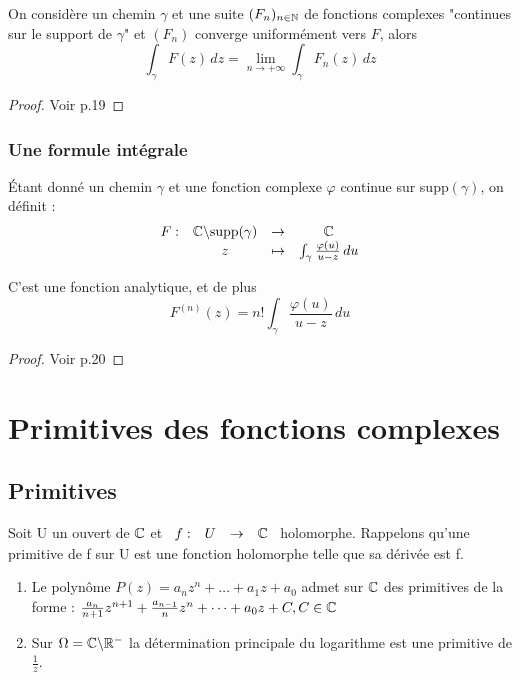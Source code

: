 \documentclass[]{report}
\begin{document}
\begin{lm}{}{}
    On considère un chemin $\gamma$ et une suite $(F_n)_{n\in\mathbb{N}}$ de fonctions complexes "continues sur le support de $\gamma$" et $(F_n)$ converge uniformément vers $F$, alors $$\int_\gamma F(z)\,dz=\lim_{n\to+\infty}\int_\gamma F_n(z)\,dz$$
\end{lm}

\begin{proof}{}{}
    Voir p.19
\end{proof}

\subsection{Une formule intégrale}

\begin{prop}{}{}
    Étant donné un chemin $\gamma$ et une fonction complexe $\varphi$ continue sur supp$(\gamma)$, on définit : $$\begin{array}{ccccc}
F : & \mathbb{C}\backslash\text{supp}(\gamma) & \to & \mathbb{C} \\
  & z & \mapsto & \int_\gamma \frac{\varphi(u)}{u-z} \,du
\end{array}$$
\begin{center}
    C'est une fonction analytique, et de plus\\
    $$F^{(n)}(z)=n!\int_\gamma\frac{\varphi(u)}{u-z}\,du$$
\end{center}
\end{prop}

\begin{proof}{}{}
    Voir p.20
\end{proof}

\chapter{Primitives des fonctions complexes}

\section{Primitives}

Soit U un ouvert de $\mathbb{C}$ et $\begin{array}{ccccc}
f : & U & \to & \mathbb{C}
\end{array}$ holomorphe. Rappelons qu'une primitive de f sur U est une fonction holomorphe telle que sa dérivée est f.

\begin{ex}{}{}
    \begin{enumerate}
        \item Le polynôme $P(z)=a_nz^n+\dots+a_1z+a_0$ admet sur $\mathbb{C}$ des primitives de la forme : $\frac{a_n}{n+1}z^{n+1}+\frac{a_{n-1}}{n}z^n+\dots+a_0z+C,C\in\mathbb{C}$
        \item Sur $\Omega=\mathbb{C}\backslash\mathbb{R}^-$ la détermination principale du logarithme est une primitive de $\frac{1}{z}$.
    \end{enumerate}
\end{ex}
\end{document}

